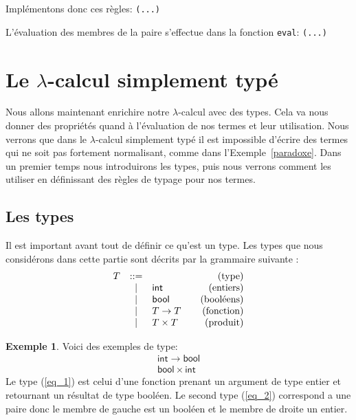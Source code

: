\documentclass {article}
\makeatletter
\newcommand{\codefrom}[3]
           {}
\theoremstyle{definition}
\newtheorem{example}{Exemple}
\theoremstyle{remark}
\newenvironment{bnf}
               {\[\begin{array}{lcl@{\qquad}r}}
               {\end{array}\]}
\newcommand{\fun}[1]{\lstinline!#1!}
\makeatother
\begin{document}
Implémentons donc ces règles:
\codefrom{untyped}{lambda}{iota_sig} \lstinline{(...)}
\codefrom{untyped}{lambda}{pair_evaluation}
L'évaluation des membres de la paire s'effectue dans la fonction \fun{eval}:
\codefrom{untyped}{lambda}{evaluation_sig} \lstinline{(...)}
\codefrom{untyped}{lambda}{evaluation_pair}



\section{Le $\lambda$-calcul simplement typé}

Nous allons maintenant enrichire notre $\lambda$-calcul avec des
types. Cela va nous donner des propriétés quand à l'évaluation de nos
termes et leur utilisation. Nous verrons que dans le $\lambda$-calcul
simplement typé il est impossible d'écrire des termes qui ne soit pas
fortement normalisant, comme dans l'Exemple~\ref{paradoxe}. Dans un
premier temps nous introduirons les types, puis nous verrons comment
les utiliser en définissant des règles de typage pour nos termes.


\subsection{Les types}
\label{simple_type}


\newcommand{\intg}{\ensuremath{\mathsf{int}}}
\newcommand{\bool}{\ensuremath{\mathsf{bool}}}

Il est important avant tout de définir ce qu'est un type. Les types
que nous considérons dans cette partie sont décrits par la grammaire
suivante :
%
\begin{bnf}
  T &::=& &\mbox{(type)}\\
  &|& \intg{} &\mbox{(entiers)}\\ 
  &|& \bool{} &\mbox{(booléens)}\\
  &|& T \rightarrow T &\mbox{(fonction)}\\
  &|& T \times T &\mbox{(produit)}\\
\end{bnf}

\begin{example}
  Voici des exemples de type:
  \begin{eqnarray}
    \intg \rightarrow \bool  \label{eq_1}  \\
    \bool \times \intg \label{eq_2} 
  \end{eqnarray}
  Le type (\ref{eq_1}) est celui d'une fonction prenant un argument de type entier et 
  retournant un résultat de type booléen.
  Le second type (\ref{eq_2}) correspond a une paire donc le membre de gauche est un booléen
  et le membre de droite un entier.
\end{example}
\end{document}
